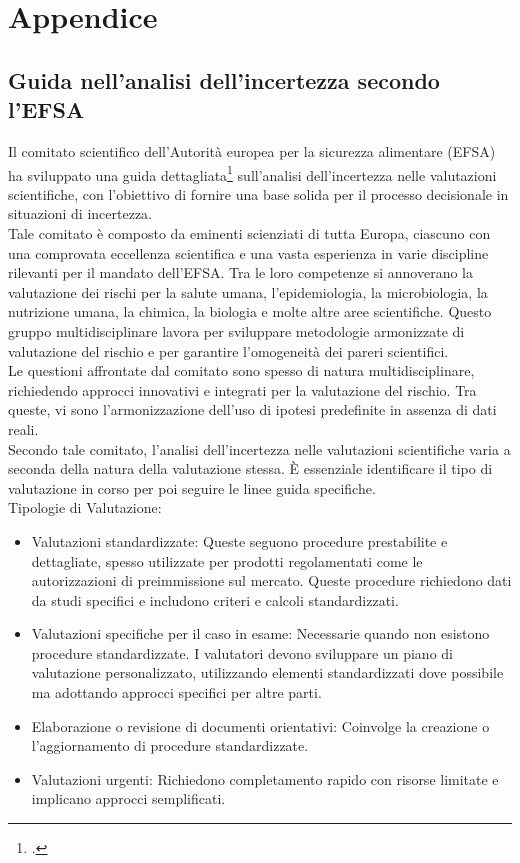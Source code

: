 \chapter{Appendice}
\section{Guida nell'analisi dell'incertezza secondo l'EFSA}

Il comitato scientifico dell'Autorità europea per la sicurezza alimentare (EFSA) ha sviluppato una guida dettagliata\footcite{womak:guida-analisi-incertezza} sull'analisi dell'incertezza nelle valutazioni scientifiche, con l'obiettivo di fornire una base solida per il processo decisionale in situazioni di incertezza.\\
Tale comitato è composto da eminenti scienziati di tutta Europa, ciascuno con una comprovata eccellenza scientifica e una vasta esperienza in varie discipline rilevanti per il mandato dell'EFSA. Tra le loro competenze si annoverano la valutazione dei rischi per la salute umana, l'epidemiologia, la microbiologia, la nutrizione umana, la chimica, la biologia e molte altre aree scientifiche. Questo gruppo multidisciplinare lavora per sviluppare metodologie armonizzate di valutazione del rischio e per garantire l'omogeneità dei pareri scientifici.\\
Le questioni affrontate dal comitato sono spesso di natura multidisciplinare, richiedendo approcci innovativi e integrati per la valutazione del rischio. Tra queste, vi sono l'armonizzazione dell'uso di ipotesi predefinite in assenza di dati reali.\\

Secondo tale comitato, l'analisi dell'incertezza nelle valutazioni scientifiche varia a seconda della natura della valutazione stessa. È essenziale identificare il tipo di valutazione in corso per poi seguire le linee guida specifiche.\\

\noindent Tipologie di Valutazione:
\begin{itemize}
    \item Valutazioni standardizzate: Queste seguono procedure prestabilite e dettagliate, spesso utilizzate per prodotti regolamentati come le autorizzazioni di preimmissione sul mercato. Queste procedure richiedono dati da studi specifici e includono criteri e calcoli standardizzati.
    \item  Valutazioni specifiche per il caso in esame: Necessarie quando non esistono procedure standardizzate. I valutatori devono sviluppare un piano di valutazione personalizzato, utilizzando elementi standardizzati dove possibile ma adottando approcci specifici per altre parti.
    \item  Elaborazione o revisione di documenti orientativi: Coinvolge la creazione o l'aggiornamento di procedure standardizzate.
    \item  Valutazioni urgenti: Richiedono completamento rapido con risorse limitate e implicano approcci semplificati.
    
\end{itemize}

